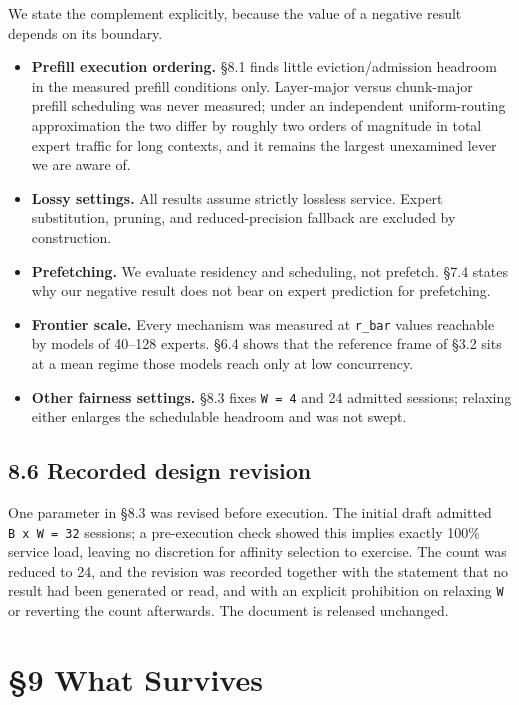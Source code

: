 \documentclass[
  10pt,
  letterpaper,
  10pt]{article}
\providecommand{\tightlist}{%
  \setlength{\itemsep}{0pt}\setlength{\parskip}{0pt}}
\begin{document}
We state the complement explicitly, because the value of a negative
result depends on its boundary.

\begin{itemize}
\tightlist
\item
  \textbf{Prefill execution ordering.} §8.1 finds little
  eviction/admission headroom in the measured prefill conditions only.
  Layer-major versus chunk-major prefill scheduling was never measured;
  under an independent uniform-routing approximation the two differ by
  roughly two orders of magnitude in total expert traffic for long
  contexts, and it remains the largest unexamined lever we are aware of.
\item
  \textbf{Lossy settings.} All results assume strictly lossless service.
  Expert substitution, pruning, and reduced-precision fallback are
  excluded by construction.
\item
  \textbf{Prefetching.} We evaluate residency and scheduling, not
  prefetch. §7.4 states why our negative result does not bear on expert
  prediction for prefetching.
\item
  \textbf{Frontier scale.} Every mechanism was measured at
  \texttt{r\_bar} values reachable by models of 40--128 experts. §6.4
  shows that the reference frame of §3.2 sits at a mean regime those
  models reach only at low concurrency.
\item
  \textbf{Other fairness settings.} §8.3 fixes \texttt{W\ =\ 4} and 24
  admitted sessions; relaxing either enlarges the schedulable headroom
  and was not swept.
\end{itemize}

\subsection{8.6 Recorded design
revision}\label{recorded-design-revision}

One parameter in §8.3 was revised before execution. The initial draft
admitted \texttt{B\ x\ W\ =\ 32} sessions; a pre-execution check showed
this implies exactly 100\% service load, leaving no discretion for
affinity selection to exercise. The count was reduced to 24, and the
revision was recorded together with the statement that no result had
been generated or read, and with an explicit prohibition on relaxing
\texttt{W} or reverting the count afterwards. The document is released
unchanged.

\section{§9 What Survives}\label{what-survives}
\end{document}
